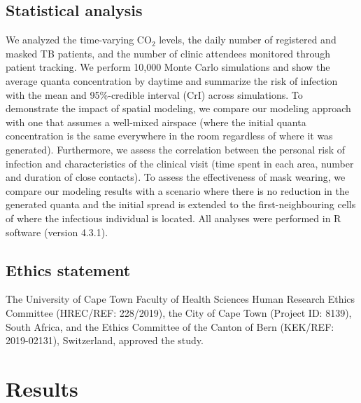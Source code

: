 \documentclass[fleqn,11pt]{wlscirep}
\begin{document}
\subsection{Statistical analysis}

We analyzed the time-varying CO$_2$ levels, the daily number of registered and masked TB patients, and the number of clinic attendees monitored through patient tracking. We perform 10,000 Monte Carlo simulations and show the average quanta concentration by daytime and summarize the risk of infection with the mean and 95\%-credible interval (CrI) across simulations. To demonstrate the impact of spatial modeling, we compare our modeling approach with one that assumes a well-mixed airspace (\ie where the initial quanta concentration is the same everywhere in the room regardless of where it was generated). Furthermore, we assess the correlation between the personal risk of infection and characteristics of the clinical visit (time spent in each area, number and duration of close contacts). To assess the effectiveness of mask wearing, we compare our modeling results with a scenario where there is no reduction in the generated quanta and the initial spread is extended to the first-neighbouring cells of where the infectious individual is located. All analyses were performed in R software (version 4.3.1)\cite{RCoreTeam2023}.


\subsection{Ethics statement}

The University of Cape Town Faculty of Health Sciences Human Research Ethics Committee (HREC/REF: 228/2019), the City of Cape Town (Project ID: 8139), South Africa, and the Ethics Committee of the Canton of Bern (KEK/REF: 2019-02131), Switzerland, approved the study.

\newpage

\section{Results}
\end{document}
